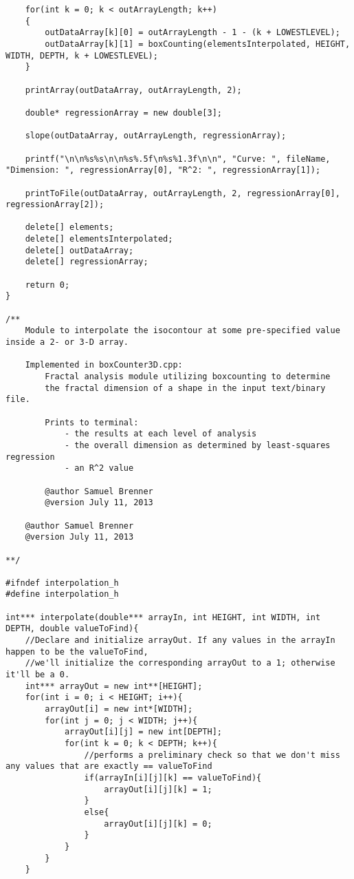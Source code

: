 \begin{lstlisting}
	for(int k = 0; k < outArrayLength; k++)
	{
		outDataArray[k][0] = outArrayLength - 1 - (k + LOWESTLEVEL);
		outDataArray[k][1] = boxCounting(elementsInterpolated, HEIGHT, WIDTH, DEPTH, k + LOWESTLEVEL);
	}

	printArray(outDataArray, outArrayLength, 2);

	double* regressionArray = new double[3];

	slope(outDataArray, outArrayLength, regressionArray);

	printf("\n\n%s%s\n\n%s%.5f\n%s%1.3f\n\n", "Curve: ", fileName, "Dimension: ", regressionArray[0], "R^2: ", regressionArray[1]);

	printToFile(outDataArray, outArrayLength, 2, regressionArray[0], regressionArray[2]);

	delete[] elements;
	delete[] elementsInterpolated;
	delete[] outDataArray;
	delete[] regressionArray;

	return 0;
}

/**
	Module to interpolate the isocontour at some pre-specified value inside a 2- or 3-D array.

	Implemented in boxCounter3D.cpp:
		Fractal analysis module utilizing boxcounting to determine 
		the fractal dimension of a shape in the input text/binary file.

		Prints to terminal:
			- the results at each level of analysis
			- the overall dimension as determined by least-squares regression
			- an R^2 value
			
		@author Samuel Brenner
		@version July 11, 2013

	@author Samuel Brenner
	@version July 11, 2013

**/

#ifndef interpolation_h
#define interpolation_h

int*** interpolate(double*** arrayIn, int HEIGHT, int WIDTH, int DEPTH, double valueToFind){
	//Declare and initialize arrayOut. If any values in the arrayIn happen to be the valueToFind,
	//we'll initialize the corresponding arrayOut to a 1; otherwise it'll be a 0.
	int*** arrayOut = new int**[HEIGHT];
	for(int i = 0; i < HEIGHT; i++){
		arrayOut[i] = new int*[WIDTH];
		for(int j = 0; j < WIDTH; j++){
			arrayOut[i][j] = new int[DEPTH];
			for(int k = 0; k < DEPTH; k++){
				//performs a preliminary check so that we don't miss any values that are exactly == valueToFind
				if(arrayIn[i][j][k] == valueToFind){
					arrayOut[i][j][k] = 1;
				}
				else{
					arrayOut[i][j][k] = 0;
				}
			}
		}
	}


\end{lstlisting}
